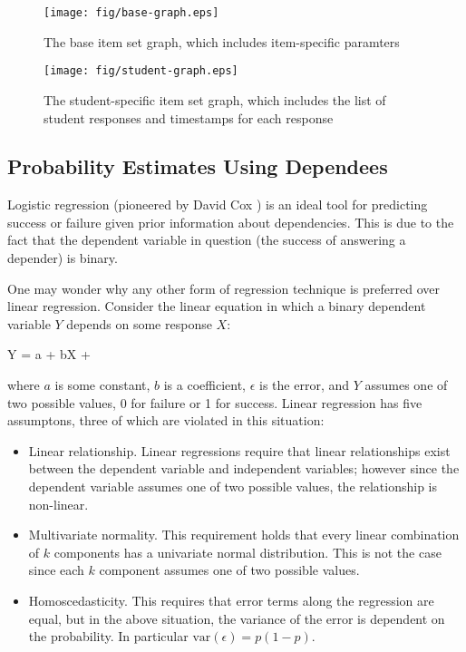 \begin{figure}[!p]
\label{fig:base-graph}
  \centering\texttt{[image: fig/base-graph.eps]}
\caption{The base item set graph, which includes item-specific paramters}
\end{figure}

\begin{figure}[!p]
\label{fig:student-graph}
  \centering\texttt{[image: fig/student-graph.eps]}
\caption{The student-specific item set graph, which includes the list of
student responses and timestamps for each response}
\end{figure}

\subsection{Probability Estimates Using Dependees}

Logistic regression (pioneered by David Cox \cite{cox:1958}) is an ideal tool
for predicting success or failure given prior information about dependencies.
This is due to the fact that the dependent variable in question (the success of
answering a depender) is binary.  

One may wonder why any other form of regression technique is preferred over
linear regression.  Consider the linear equation in which a binary dependent
variable $Y$ depends on some response $X$:

\begin{equations}
         Y = a + bX + \epsilon
\end{equations}

where $a$ is some constant, $b$ is a coefficient, $\epsilon$ is the error, and
$Y$ assumes one of two possible values, 0 for failure or 1 for success.  Linear
regression has five assumptons, three of which are violated in this situation:


\begin{itemize}

  \item Linear relationship. Linear regressions require that linear
  relationships exist between the dependent variable and independent variables;
  however since the dependent variable assumes one of two possible values, the
  relationship is non-linear.

  \item Multivariate normality. This requirement holds that every linear
  combination of $k$ components has a univariate normal distribution.  This
  is not the case since each $k$ component assumes one of two possible values.

  \item Homoscedasticity. This requires that error terms along the regression
  are equal, but in the above situation, the variance of the error is dependent
  on the probability.   In particular $\mathrm{var}(\epsilon) = p(1-p)$.

\end{itemize} 

